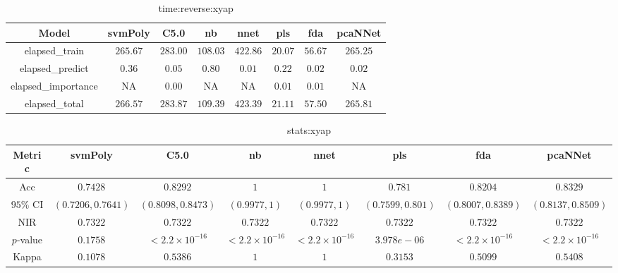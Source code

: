 \begin{table}[!ht]
	\centering
	\begin{tabular}{|c|c|c|c|c|c|c|c|}
		\hline
		Model & svmPoly & C5.0 & nb & nnet & pls & fda & pcaNNet \\ \hline
		elapsed_train & $265.67$ & $283.00$ & $108.03$ & $422.86$ & $20.07$ & $56.67$ & $265.25$ \\ \hline
		elapsed_predict & $0.36$ & $0.05$ & $0.80$ & $0.01$ & $0.22$ & $0.02$ & $0.02$ \\ \hline
		elapsed_importance & NA & $0.00$ & NA & NA & $0.01$ & $0.01$ & NA \\ \hline
		elapsed_total & $266.57$ & $283.87$ & $109.39$ & $423.39$ & $21.11$ & $57.50$ & $265.81$ \\ \hline
	\end{tabular}
	\caption{time:reverse:xyap}
	\label{tab:time:reverse:xyap}
\end{table}

\begin{table}[!ht]
	\centering
	\begin{tabular}{|c|c|c|c|c|c|c|c|}
		\hline
		Metric & svmPoly & C5.0 & nb & nnet & pls & fda & pcaNNet \\ \hline
		Acc & $0.7428$ & $0.8292$ & $1$ & $1$ & $0.781$ & $0.8204$ & $0.8329$ \\ \hline
		$95\%$ CI & $(0.7206, 0.7641)$ & $(0.8098, 0.8473)$ & $(0.9977, 1)$ & $(0.9977, 1)$ & $(0.7599, 0.801)$ & $(0.8007, 0.8389)$ & $(0.8137, 0.8509)$ \\ \hline
		NIR & $0.7322$ & $0.7322$ & $0.7322$ & $0.7322$ & $0.7322$ & $0.7322$ & $0.7322$ \\ \hline
		$p$-value & $0.1758$ & $< 2.2 \times {10}^{-16}$ & $< 2.2 \times {10}^{-16}$ & $< 2.2 \times {10}^{-16}$ & $3.978e-06$ & $< 2.2 \times {10}^{-16}$ & $< 2.2 \times {10}^{-16}$ \\ \hline
		Kappa & $0.1078$ & $0.5386$ & $1$ & $1$ & $0.3153$ & $0.5099$ & $0.5408$ \\ \hline
	\end{tabular}
	\caption{stats:xyap}
	\label{tab:stats:xyap}
\end{table}

